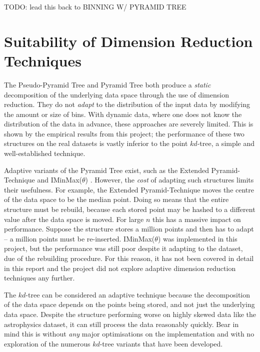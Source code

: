 TODO: lead this back to BINNING W/ PYRAMID TREE


\section{Suitability of Dimension Reduction Techniques}

The Pseudo-Pyramid Tree and Pyramid Tree both produce a \textit{static} decomposition of the underlying data space through the use of dimension reduction. They do not \textit{adapt} to the distribution of the input data by modifying the amount or size of bins. With dynamic data, where one does not know the distribution of the data in advance, these approaches are severely limited. This is shown by the empirical results from this project; the performance of these two structures on the real datasets is vastly inferior to the point $kd$-tree, a simple and well-established technique.

Adaptive variants of the Pyramid Tree exist, such as the Extended Pyramid-Technique \cite{pyramid-tree} and IMinMax($\theta$) \cite{iminmax}. However, the \textit{cost} of adapting such structures limits their usefulness. For example, the Extended Pyramid-Technique moves the centre of the data space to be the median point. Doing so means that the entire structure must be rebuild, because each stored point may be hashed to a different value after the data space is moved. For large $n$ this has a massive impact on performance. Suppose the structure stores a million points and then has to adapt -- a million points must be re-inserted. IMinMax($\theta$) was implemented in this project, but the performance was still poor despite it adapting to the dataset, due of the rebuilding procedure. For this reason, it has not been covered in detail in this report and the project did not explore adaptive dimension reduction techniques any further.

The $kd$-tree can be considered an adaptive technique because the decomposition of the data space depends on the points being stored, and not just the underlying data space. Despite the structure performing worse on highly skewed data like the astrophysics dataset, it can still process the data reasonably quickly. Bear in mind this is without \textit{any} major optimisations on the implementation and with no exploration of the numerous $kd$-tree variants that have been developed.

